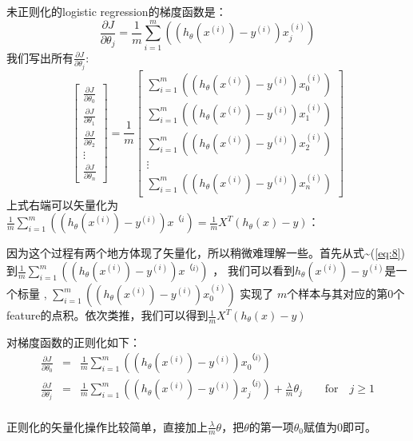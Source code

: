 \documentclass[10pt,a4paper,UTF8]{article}
\begin{document}
未正则化的logistic regression的梯度函数是：
\begin{equation}
\label{eq:7}
\frac{\partial J}{\partial \theta_{j}} = \frac{1}{m} \sum_{i=1}^{m}( (h_{\theta}(x^{(i)}) - y^{(i)}) x_{j}^{(i)} )
\end{equation}
我们写出所有\(\frac{\partial J}{\partial \theta_{j}}\):
\begin{equation}
\label{eq:8}
\begin{bmatrix}
\frac{\partial J}{\partial \theta_{0}} \\
\frac{\partial J}{\partial \theta_{1}} \\
\frac{\partial J}{\partial \theta_{2}} \\
\vdots \\
\frac{\partial J}{\partial \theta_{n}}
\end{bmatrix}
=
\frac{1}{m}
\begin{bmatrix}
\sum_{i=1}^{m} (  (h_{\theta}(x^{(i)}) - y^{(i)}) x_{0}^{(i)} )\\
\sum_{i=1}^{m} (  (h_{\theta}(x^{(i)}) - y^{(i)}) x_{1}^{(i)} )\\
\sum_{i=1}^{m} (  (h_{\theta}(x^{(i)}) - y^{(i)}) x_{2}^{(i)} )\\
\vdots \\
\sum_{i=1}^{m} (  (h_{\theta}(x^{(i)}) - y^{(i)}) x_{n}^{(i)} )
\end{bmatrix}

\end{equation}
上式右端可以矢量化为\(\frac{1}{m} \sum_{i=1}^{m}( (h_{\theta}(x^{(i)}) -y^{(i)} )x^{（i})  = \frac{1}{m} X^{T} (h_{\theta}(x) - y)\)：

因为这个过程有两个地方体现了矢量化，所以稍微难理解一些。首先从式\textasciitilde{}(\ref{eq:8})到\(\frac{1}{m} \sum_{i=1}^{m}( (h_{\theta}(x^{(i)}) -y^{(i)} )x^{（i)})\) ， 我们可以看到\(h_{\theta}(x^{(i)}) - y^{(i)}\)是一个标量 , \(\sum_{i=1}^{m} (  (h_{\theta}(x^{(i)}) - y^{(i)}) x_{0}^{(i)} )\) 实现了 \(m\)个样本与其对应的第\(0\)个feature的点积。依次类推，我们可以得到\(\frac{1}{m} X^{T}(h_{\theta}(x)  -y )\)

对梯度函数的正则化如下：
\begin{eqnarray*}
\frac{\partial J}{\partial \theta_{0}}&=& \frac{1}{m} \sum_{i=1}^{m}( (h_{\theta}(x^{(i)}) -y^{(i)} )x_{0}^{（i)}) \\
\frac{\partial J}{\partial \theta_{j}}&=& \frac{1}{m} \sum_{i=1}^{m}( (h_{\theta}(x^{(i)}) -y^{(i)} )x_{j}^{（i)})  + \frac{\lambda}{m}\theta_{j} \qquad \mathrm{for}\quad j\geq 1\\
\end{eqnarray*}

正则化的矢量化操作比较简单，直接加上\(\frac{\lambda}{m}\theta\)，把\(\theta\)的第一项\(\theta_{0}\)赋值为0即可。
\end{document}
